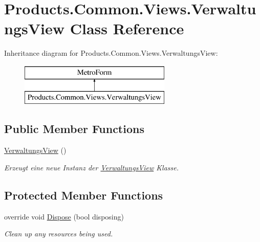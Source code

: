 \hypertarget{class_products_1_1_common_1_1_views_1_1_verwaltungs_view}{}\section{Products.\+Common.\+Views.\+Verwaltungs\+View Class Reference}
\label{class_products_1_1_common_1_1_views_1_1_verwaltungs_view}
Inheritance diagram for Products.\+Common.\+Views.\+Verwaltungs\+View\+:\begin{figure}[H]
\begin{center}
\leavevmode
\includegraphics[height=2.000000cm]{class_products_1_1_common_1_1_views_1_1_verwaltungs_view}
\end{center}
\end{figure}
\subsection*{Public Member Functions}
\begin{DoxyCompactItemize}
\item 
\hyperlink{class_products_1_1_common_1_1_views_1_1_verwaltungs_view_a010ae18d7a62d33fbfbf323ff1181705}{Verwaltungs\+View} ()
\begin{DoxyCompactList}\small\item\em Erzeugt eine neue Instanz der \hyperlink{class_products_1_1_common_1_1_views_1_1_verwaltungs_view}{Verwaltungs\+View} Klasse. \end{DoxyCompactList}\end{DoxyCompactItemize}
\subsection*{Protected Member Functions}
\begin{DoxyCompactItemize}
\item 
override void \hyperlink{class_products_1_1_common_1_1_views_1_1_verwaltungs_view_a49d29bef5102e736170090b4c5ad4e26}{Dispose} (bool disposing)
\begin{DoxyCompactList}\small\item\em Clean up any resources being used. \end{DoxyCompactList}\end{DoxyCompactItemize}


